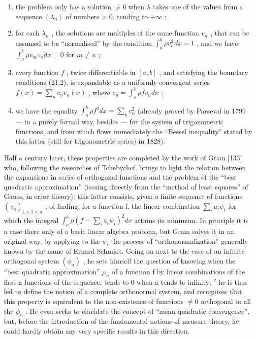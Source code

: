 \begin{enumerate}
\def\labelenumi{\arabic{enumi})}
\item
  the problem only has a solution \(\neq 0\) when \(\lambda\) takes one of the values from a sequence \((\lambda_{n})\) of numbers \textgreater{} 0, tending to \(+\infty\) ;
\item
  for each \(\lambda_{n}\) , the solutions are multiples of the same function \(v_{n}\) , that can be assumed to be ``normalised'' by the condition \(\int_{a}^{b} \rho v_{n}^{2} dx = 1\) , and we have \(\int_{a}^{b} \rho v_{m} v_{n} dx = 0\) for \(m \neq n\) ;
\item
  every function \(f\) , twice differentiable in \([a, b]\) , and satisfying the boundary conditions (21.2), is expandable as a uniformly convergent series \(f(x) = \sum_{n} c_{n} v_{n}(x)\) , where \(c_{n} = \int_{a}^{b} \rho f v_{n} dx\) ;
\item
  we have the equality \(\int_{a}^{b}\rho f^{2}dx=\sum_{n}c_{n}^{2}\) (already proved by Parseval in 1799 --- in a purely formal way, besides --- for the system of trigonometric functions, and from which flows immediately the ``Bessel inequality'' stated by this latter (still for trigonometric series) in 1828).
\end{enumerate}

Half a century later, these properties are completed by the work of Gram {[}133{]} who, following the researches of Tchebychef, brings to light the relation between the expansions in series of orthogonal functions and the problem of the ``best quadratic approximation'' (issuing directly from the ``method of least squares'' of Gauss, in error theory): this latter consists, given a finite sequence of functions \((\psi_{i})_{1\leq i\leq n}\) , of finding, for a function f, the linear combination \(\sum_{i}a_{i}\psi_{i}\) for which the integral \(\int_{a}^{b}\rho(f-\sum_{i}a_{i}\psi_{i})^{2}dx\) attains its minimum. In principle it is a case there only of a basic linear algebra problem, but Gram solves it in an original way, by applying to the \(\psi_{i}\) the process of ``orthonormalization'' generally known by the name of Erhard Schmidt. Going on next to the case of an infinite orthogonal system \((\phi_{n})\) , he sets himself the question of knowing when the ``best quadratic approximation'' \(\mu_{n}\) of a function f by linear combinations of the first n functions of the sequence, tends to 0 when n tends to infinity; \(^{2}\) he is thus led to define the notion of a complete orthonormal system, and recognises that this property is equivalent to the non-existence of functions \(\neq0\) orthogonal to all the \(\phi_{n}\) . He even seeks to elucidate the concept of ``mean quadratic convergence'', but, before the introduction of the fundamental notions of measure theory, he could hardly obtain any very specific results in this direction.

